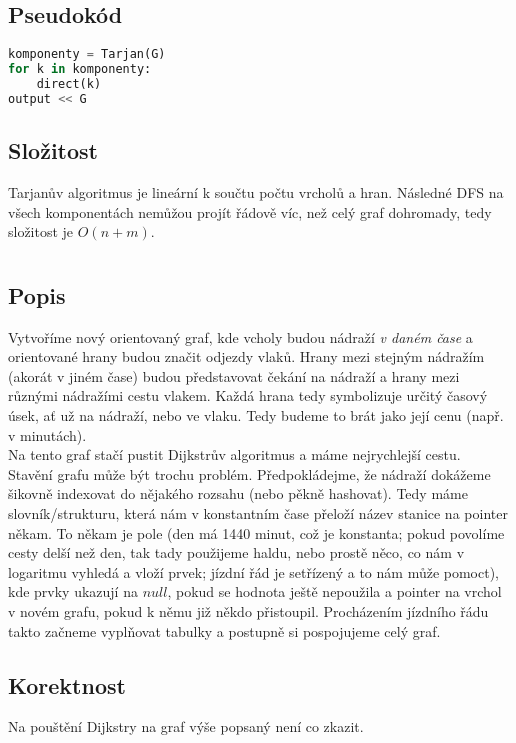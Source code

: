 \documentclass[a4paper]{article}
\begin{document}
\subsection{Pseudokód}
\begin{lstlisting}[language=Python]
komponenty = Tarjan(G)
for k in komponenty:
	direct(k)
output << G
\end{lstlisting}
\subsection{Složitost}
Tarjanův algoritmus je lineární k součtu počtu vrcholů a hran. Následné DFS na všech komponentách nemůžou projít řádově víc, než celý graf dohromady, tedy složitost je $O(n+m)$.

\section{}
\subsection{Popis}
Vytvoříme nový orientovaný graf, kde vcholy budou nádraží \textit{v daném čase} a orientované hrany budou značit odjezdy vlaků. Hrany mezi stejným nádražím (akorát v jiném čase) budou představovat čekání na nádraží a hrany mezi různými nádražími cestu vlakem. Každá hrana tedy symbolizuje určitý časový úsek, ať už na nádraží, nebo ve vlaku. Tedy budeme to brát jako její cenu (např. v minutách).\\
Na tento graf stačí pustit Dijkstrův algoritmus a máme nejrychlejší cestu.\\
Stavění grafu může být trochu problém. Předpokládejme, že nádraží dokážeme šikovně indexovat do nějakého rozsahu (nebo pěkně hashovat). Tedy máme slovník/strukturu, která nám v konstantním čase přeloží název stanice na pointer někam. To někam je pole (den má 1440 minut, což je konstanta; pokud povolíme cesty delší než den, tak tady použijeme haldu, nebo prostě něco, co nám v logaritmu vyhledá a vloží prvek; jízdní řád je setřízený a to nám může pomoct), kde prvky ukazují na $null$, pokud se hodnota ještě nepoužila a pointer na vrchol v novém grafu, pokud k němu již někdo přistoupil. Procházením jízdního řádu takto začneme vyplňovat tabulky a postupně si pospojujeme celý graf.
\subsection{Korektnost}
Na pouštění Dijkstry na graf výše popsaný není co zkazit.
\end{document}
